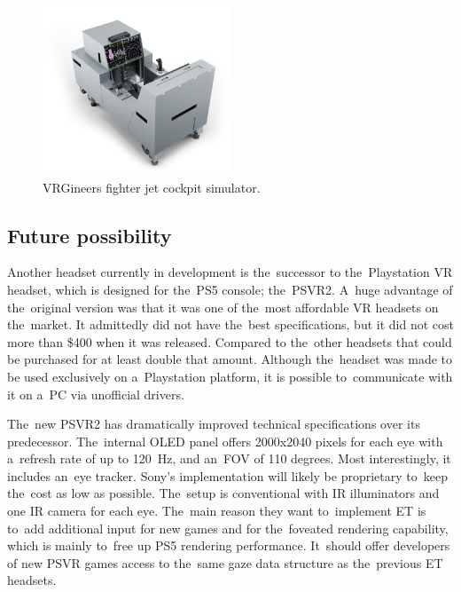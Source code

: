 \begin{figure}[!ht]\centering
    \includegraphics[width=0.5\textwidth]{img/xtal-cockpit.png}
    \caption[VRGineers fighter jet cockpit simulator.]{VRGineers fighter jet cockpit simulator.~\cite{vrgineers-cockpit}}
    \label{fig:vrg-cockpit}
\end{figure}

\subsection{Future possibility}

Another headset currently in development is the~successor to the~Playstation VR headset, which is designed for the~PS5 console; the~PSVR2. A~huge advantage of the~original version was that it was one of the~most affordable VR headsets on the~market. It admittedly did not have the~best specifications, but it did not cost more than \$400 when it was released. Compared to the~other headsets that could be purchased for at least double that amount. Although the~headset was made to be used exclusively on a~Playstation platform, it is possible to~communicate with it on a~PC via unofficial drivers.

The~new PSVR2 has dramatically improved technical specifications over its predecessor. The~internal OLED panel offers 2000x2040 pixels for each eye with a~refresh rate of up to 120~Hz, and an~FOV of 110 degrees. Most interestingly, it includes an~eye tracker. Sony's implementation will likely be proprietary to~keep the~cost as low as possible. The~setup is conventional with IR illuminators and one IR camera for each eye. The~main reason they want to~implement ET is to~add additional input for new games and for the~foveated rendering capability, which is mainly to~free up PS5 rendering performance. It~should offer developers of new PSVR games access to the~same gaze data structure as the~previous ET headsets.~\cite{psvr2, psvr2-specs}

